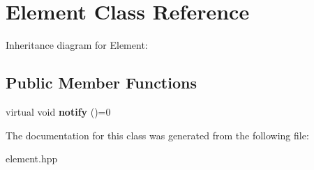 \hypertarget{classElement}{}\section{Element Class Reference}
\label{classElement}


Inheritance diagram for Element\+:
\subsection*{Public Member Functions}
\begin{DoxyCompactItemize}
\item 
virtual void {\bfseries notify} ()=0\hypertarget{classElement_a3374a4e8de32e7f1c80d63deaec4d1b2}{}\label{classElement_a3374a4e8de32e7f1c80d63deaec4d1b2}

\end{DoxyCompactItemize}


The documentation for this class was generated from the following file\+:\begin{DoxyCompactItemize}
\item 
element.\+hpp\end{DoxyCompactItemize}
